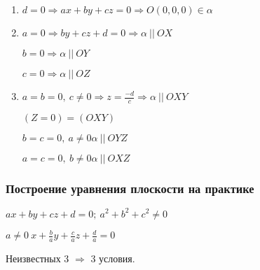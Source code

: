 \documentclass{article}
\begin{document}
    \begin{enumerate}
        \item \( d = 0 \Rightarrow ax + by + cz = 0 \Rightarrow O(0, 0, 0) \in \alpha \) 
        \item 
        
        \( a = 0 \Rightarrow by + cz + d = 0 \Rightarrow \alpha\ ||\ OX \)
        
        \( b = 0 \Rightarrow \alpha\ ||\ OY \)
        
        \( c = 0 \Rightarrow \alpha\ ||\ OZ\)

        \item
        
        \(a = b = 0,\ c \neq 0 \Rightarrow z = \frac{-d}{c} \Rightarrow \alpha\ ||\ OXY\)
        
        \( (Z = 0) = (OXY) \)

        \(b = c = 0,\ a \neq 0 \alpha\ ||\ OYZ\)
        
        \(a = c = 0,\ b \neq 0 \alpha\ ||\ OXZ\)
    \end{enumerate}

    \subsubsection{Построение уравнения плоскости на практике}

    \(ax + by + cz + d = 0;\ a^2 + b^2 + c^2 \neq 0\)

    \(a \neq 0\ x + \frac{b}{a}y + \frac{c}{a}z + \frac{d}{a} = 0\)

    Неизвестных 3 \(\Rightarrow\) 3 условия.
\end{document}
